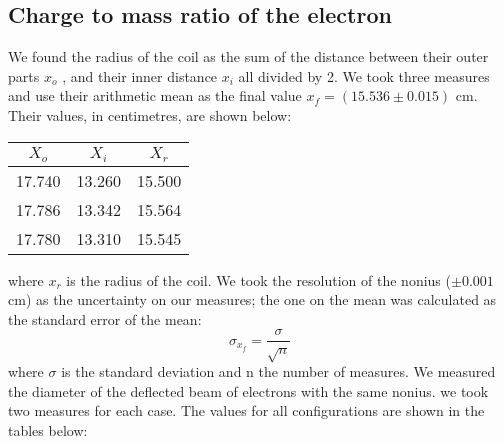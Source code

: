 \subsection{Charge to mass ratio of the electron}
We found the radius of the coil as the sum of the distance between their outer parts $x_o$ , and their inner distance $x_i$ all divided by 2. We took three measures  and use their arithmetic mean as the final value $x_f=(15.536\pm 0.015)$ cm. Their values, in centimetres, are shown below:

\begin{table}[h!]
    \centering
        \begin{tabular}{|c|c|c|}
            \hline
            \textbf{$X_o$} & \textbf{$X_i$} & \textbf{$X_r$} \\
            \hline
            17.740 & 13.260 & 15.500 \\
            \hline
            17.786 & 13.342 & 15.564 \\
            \hline
            17.780 & 13.310 & 15.545 \\
            \hline
        \end{tabular} 
\end{table}
where $x_r$ is the radius of the coil.  
We took the resolution of the nonius ($\pm 0.001$ cm) as the uncertainty on our measures; the one on the mean was calculated as the standard error of the mean:
\begin{equation*}
    \sigma_{x_f}=\frac{\sigma}{\sqrt{n}}
\end{equation*}
where $\sigma$ is the standard deviation and n the number of measures.
We measured the diameter of the deflected beam of electrons with the same nonius. we took two measures for each case. The values for all configurations are shown in the tables below:
